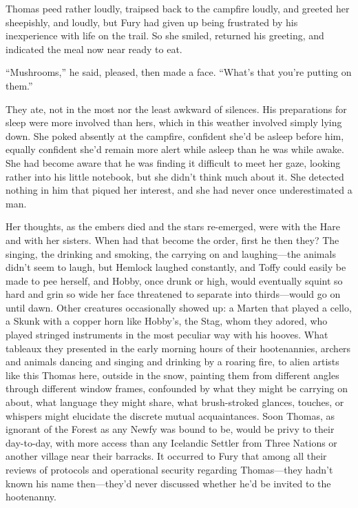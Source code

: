 \documentclass[11pt,a5paper]{article}
\begin{document}
Thomas peed rather loudly, traipsed back to the campfire loudly, and greeted her sheepishly, and loudly, but Fury had given up being frustrated by his inexperience with life on the trail. So she smiled, returned his greeting, and indicated the meal now near ready to eat.

``Mushrooms,'' he said, pleased, then made a face. ``What's that you're putting on them.''

They ate, not in the most nor the least awkward of silences. His preparations for sleep were more involved than hers, which in this weather involved simply lying down. She poked absently at the campfire, confident she'd be asleep before him, equally confident she'd remain more alert while asleep than he was while awake. She had become aware that he was finding it difficult to meet her gaze, looking rather into his little notebook, but she didn't think much about it. She detected nothing in him that piqued her interest, and she had never once underestimated a man.

Her thoughts, as the embers died and the stars re-emerged, were with the Hare and with her sisters. When had that become the order, first he then they? The singing, the drinking and smoking, the carrying on and laughing---the animals didn't seem to laugh, but Hemlock laughed constantly, and Toffy could easily be made to pee herself, and Hobby, once drunk or high, would eventually squint so hard and grin so wide her face threatened to separate into thirds---would go on until dawn. Other creatures occasionally showed up: a Marten that played a cello, a Skunk with a copper horn like Hobby's, the Stag, whom they adored, who played stringed instruments in the most peculiar way with his hooves. What tableaux they presented in the early morning hours of their hootenannies, archers and animals dancing and singing and drinking by a roaring fire, to alien artists like this Thomas here, outside in the snow, painting them from different angles through different window frames, confounded by what they might be carrying on about, what language they might share, what brush-stroked glances, touches, or whispers might elucidate the discrete mutual acquaintances. Soon Thomas, as ignorant of the Forest as any Newfy was bound to be, would be privy to their day-to-day, with more access than any Icelandic Settler from Three Nations or another village near their barracks. It occurred to Fury that among all their reviews of protocols and operational security regarding Thomas---they hadn't known his name then---they'd never discussed whether he'd be invited to the hootenanny.
\end{document}
